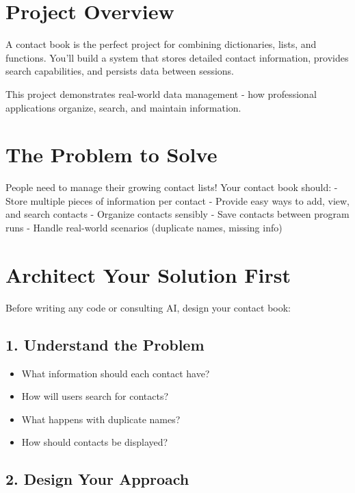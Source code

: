 \documentclass[
  letterpaper,
  DIV=11,
  numbers=noendperiod,
  oneside]{scrreprt}
\providecommand{\tightlist}{%
  \setlength{\itemsep}{0pt}\setlength{\parskip}{0pt}}\usepackage{longtable,booktabs,array}
\begin{document}
\section{Project Overview}\label{project-overview-5}

A contact book is the perfect project for combining dictionaries, lists,
and functions. You'll build a system that stores detailed contact
information, provides search capabilities, and persists data between
sessions.

This project demonstrates real-world data management - how professional
applications organize, search, and maintain information.

\section{The Problem to Solve}\label{the-problem-to-solve-5}

People need to manage their growing contact lists! Your contact book
should: - Store multiple pieces of information per contact - Provide
easy ways to add, view, and search contacts - Organize contacts sensibly
- Save contacts between program runs - Handle real-world scenarios
(duplicate names, missing info)

\section{Architect Your Solution
First}\label{architect-your-solution-first-5}

Before writing any code or consulting AI, design your contact book:

\subsection{1. Understand the Problem}\label{understand-the-problem-5}

\begin{itemize}
\tightlist
\item
  What information should each contact have?
\item
  How will users search for contacts?
\item
  What happens with duplicate names?
\item
  How should contacts be displayed?
\end{itemize}

\subsection{2. Design Your Approach}\label{design-your-approach-5}
\end{document}
